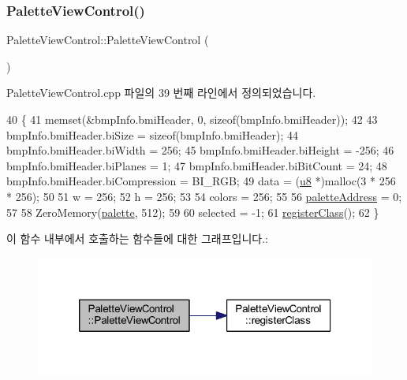\subsubsection{\texorpdfstring{Palette\+View\+Control()}{PaletteViewControl()}}
{\footnotesize\ttfamily Palette\+View\+Control\+::\+Palette\+View\+Control (\begin{DoxyParamCaption}{ }\end{DoxyParamCaption})}



Palette\+View\+Control.\+cpp 파일의 39 번째 라인에서 정의되었습니다.


\begin{DoxyCode}
40 \{
41   memset(&bmpInfo.bmiHeader, 0, \textcolor{keyword}{sizeof}(bmpInfo.bmiHeader));
42   
43   bmpInfo.bmiHeader.biSize = \textcolor{keyword}{sizeof}(bmpInfo.bmiHeader);
44   bmpInfo.bmiHeader.biWidth = 256;
45   bmpInfo.bmiHeader.biHeight = -256;
46   bmpInfo.bmiHeader.biPlanes = 1;
47   bmpInfo.bmiHeader.biBitCount = 24;
48   bmpInfo.bmiHeader.biCompression = BI\_RGB;
49   data = (\mbox{\hyperlink{_system_8h_aed742c436da53c1080638ce6ef7d13de}{u8}} *)malloc(3 * 256 * 256);
50 
51   w = 256;
52   h = 256;
53 
54   colors = 256;
55 
56   \mbox{\hyperlink{class_palette_view_control_a53b2efd4174e06a68e545608e458947b}{paletteAddress}} = 0;
57   
58   ZeroMemory(\mbox{\hyperlink{class_palette_view_control_a1a5ce1812cf6c8d26889f4eb03d1d4ec}{palette}}, 512);
59 
60   selected = -1;
61   \mbox{\hyperlink{class_palette_view_control_add54d86e21f3acfcdc129dd656109c83}{registerClass}}();
62 \}
\end{DoxyCode}
이 함수 내부에서 호출하는 함수들에 대한 그래프입니다.\+:
\nopagebreak
\begin{figure}[H]
\begin{center}
\leavevmode
\includegraphics[width=320pt]{class_palette_view_control_ae7bc315eab0f7925e3c45b063244098b_cgraph}
\end{center}
\end{figure}
\mbox{\label{class_palette_view_control_ab09935586912db770ff77aa433be4d84}} 
